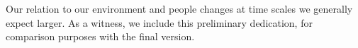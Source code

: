 
\thispagestyle{empty}


\vspace*{3cm}



Our relation to our environment and people changes at time scales we generally expect larger. As a witness, we include this preliminary dedication, for comparison purposes with the final version.



%
%

